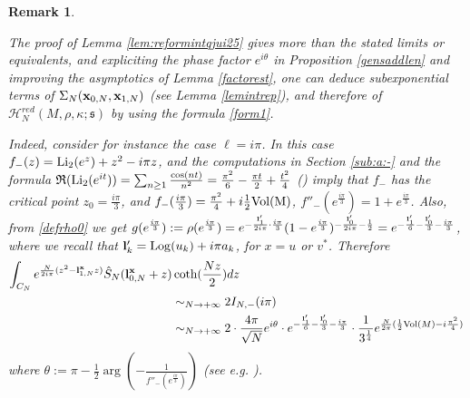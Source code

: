 \documentclass[11pt]{amsart}
\newtheorem{remark}[teo]{Remark}
\newcommand{\bx}{{\bf x}}
\newcommand{\bl}{{\bf l}}
\newcommand{\Log}{{\rm Log}}
\newcommand{\Hh}{{\mathcal H}}
\begin{document}
\begin{remark}\label{fulldev}{\rm The proof of Lemma \ref{lem:reformintqjui25} gives more than the stated limits or equivalents, and expliciting the phase factor $e^{i\theta}$ in Proposition \ref{gensaddlen} and improving the asymptotics of Lemma \ref{factorest}, one can deduce subexponential terms of $\Sigma_N(\bx_{0,N},\bx_{1,N})$ (see Lemma \ref{lemintrep}), and therefore of $\Hh_{N}^{red}(M,\rho,\kappa; \mathfrak{s})$ by using the formula \eqref{form1}. 

Indeed, consider for instance the case $\ell = i\pi$. In this case $f_-(z) = {\rm Li}_2(e^z)+z^2-i\pi z$, and the computations in Section \ref{sub:a:-} and the formula $\textstyle \mathfrak{R}({\rm Li}_2(e^{it})) = \sum_{n\geq 1} \frac{\cos(nt)}{n^2} = \frac{\pi^2}{6} - \frac{\pi t}{2}+\frac{t^2}{4}$ (\cite{Z}) imply that $f_-$ has the critical point $\textstyle z_0=\frac{i\pi}{3}$, and $\textstyle f_-(\frac{i\pi}{3}) = \frac{\pi^2}{4} + i\frac{1}{2}{\rm Vol(M)}$, $f''_-(e^{\frac{i\pi}{3}}) = 1+ e^{\frac{i\pi}{3}}$. Also, from \eqref{defrho0} we get $\textstyle g(e^{\frac{i\pi}{3}}):=\rho(e^{\frac{i\pi}{3}}) = e^{-\frac{{\bf l}_1'}{2i\pi}\cdot \frac{i\pi}{3}}(1-e^{\frac{i\pi}{3}})^{-\frac{{\bf l}_0'}{2i\pi}-\frac{1}{2}}=e^{-\frac{{\bf l}_1'}{6}-\frac{{\bf l}_0'}{3}-\frac{i\pi}{3}}$, where we recall that ${\bf l}_k' = \Log(u_k) + i\pi a_k$, for $x=u$ or $v^*$. Therefore 
\begin{align*} \int_{C_N} e^{\frac{N}{2i\pi}(z^2 - \bl_{1,N}^\bx z)} \hat S_N(\bl_{0,N}^\bx + z) \textstyle & \coth(\frac{Nz}{2}) dz\\ & \sim_{N\to +\infty} 2I_{N,-}(i\pi) \\
& \sim_{N\to +\infty} 2\cdot \frac{4\pi}{\sqrt{N}} e^{i\theta} \cdot e^{-\frac{{\bf l}_1'}{6}-\frac{{\bf l}_0'}{3}-\frac{i\pi}{3}} \cdot \frac{1}{3^\frac{1}{4}} e^{\frac{N}{2\pi}(\frac{1}{2}{\rm Vol}(M)-i\frac{\pi^2}{4})}
\end{align*}
where $\theta := \pi -\textstyle \frac{1}{2}\arg(-\frac{1}{f''_-(e^{\frac{i\pi}{3}})})$ (see e.g. \cite[equation (19)]{PV}).}
\end{remark}
\color{black}
\appendix
\end{document}
